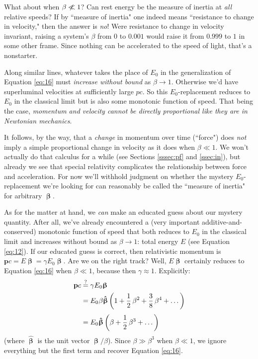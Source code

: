 \documentclass[12pt]{article}
\renewcommand{\vv}[1]{\mathbf{#1}}
\newcommand{\vvbeta}{\bm{\upbeta}}
\newcommand{\hatbeta}{\bm{\hat{\upbeta}}}
\begin{document}
What about when $\beta \centernot{\ll} 1$? Can rest energy be the measure of inertia at \emph{all} relative speeds? If by ``measure of inertia" one indeed means ``resistance to change in velocity," then the answer is \emph{no}! Were resistance to change in velocity invariant, raising a system's $\beta$ from $0$ to $0.001$ would raise it from $0.999$ to $1$ in some other frame. Since nothing can be accelerated to the speed of light, that's a nonstarter.

Along similar lines, whatever takes the place of $E_0$ in the generalization of Equation \ref{eq:16} must \emph{increase without bound} as $\beta \rightarrow 1$. Otherwise we'd have superluminal velocities at sufficiently large $p c$. So this $E_0$-replacement reduces to $E_0$ in the classical limit but is also some monotonic function of speed. That being the case, \emph{momentum and velocity cannot be directly proportional like they are in Newtonian mechanics}.

It follows, by the way, that a \emph{change} in momentum over time (``force") does \emph{not} imply a simple proportional change in velocity as it does when $\beta \ll 1$. We won't actually do that calculus for a while (see Sections \ref{sssec:pf} and \ref{ssec:in}), but already we see that special relativity complicates the relationship between force and acceleration. For now we'll withhold judgment on whether the mystery $E_0$-replacement we're looking for can reasonably be called the ``measure of inertia" for arbitrary $\vvbeta$.

As for the matter at hand, we \emph{can} make an educated guess about our mystery quantity. After all, we've already encountered a (very important additive-and-conserved) monotonic function of speed that both reduces to $E_0$ in the classical limit and increases without bound as $\beta \rightarrow 1$: total energy $E$ (see Equation \ref{eq:12}). If our educated guess is correct, then relativistic momentum is $\vv p c = E \vvbeta = \gamma E_0 \vvbeta$. Are we on the right track? Well, $E \vvbeta$ certainly reduces to Equation \ref{eq:16} when $\beta \ll 1$, because then $\gamma \approx 1$. Explicitly:
\begin{equation*}\begin{split}
\vv p c &\stackrel{?}{=}\gamma E_0 \vvbeta \\
&= E_0 \mkern.5mu \beta \hatbeta \left( 1 + \dfrac{1}{2} \, \beta ^2 +  \dfrac {3}{8} \, \beta ^4 + \dots  \right) \\[3pt]
&= E_0 \hatbeta \left( \beta + \dfrac{1}{2} \, \beta^3 + \dots \right)
\end{split}\end{equation*}
(where $\hatbeta$ is the unit vector $\vvbeta / \beta$). Since $\beta \gg \beta^3$ when $\beta \ll 1$, we ignore everything but the first term and recover Equation \ref{eq:16}.
\end{document}
